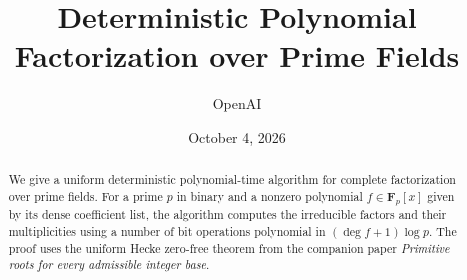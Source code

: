 \documentclass[11pt]{article}
\title{Deterministic Polynomial Factorization over Prime Fields}
\author{OpenAI}
\date{October 4, 2026}
\numberwithin{equation}{section}
\theoremstyle{definition}
\theoremstyle{remark}
\newcommand{\Fp}{\mathbf F_p}
\begin{document}
\maketitle
\begin{abstract}
We give a uniform deterministic polynomial-time algorithm for complete
factorization over prime fields. For a prime $p$ in binary and a nonzero
polynomial $f\in\Fp[x]$ given by its dense coefficient list, the algorithm
computes the irreducible factors and their multiplicities using a number of
bit operations polynomial in $(\deg f+1)\log p$. The proof uses the uniform
Hecke zero-free theorem from the companion paper \emph{Primitive roots for
every admissible integer base}.
\end{abstract}
\tableofcontents












\end{document}
